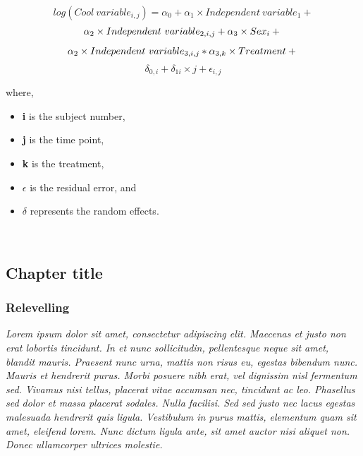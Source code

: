 \documentclass[
]{article}
\providecommand{\tightlist}{%
  \setlength{\itemsep}{0pt}\setlength{\parskip}{0pt}}
\begin{document}
\(~\)\\

\[
  log(Cool\ variable_{i,j}) = \alpha_0 + 
  \alpha_1\times Independent\ variable_1 +
\] \[
  \alpha_2\times Independent\ variable_{2,i,j} +
  \alpha_3\times Sex_i + \\
\] \[
  \alpha_2\times Independent\ variable_{3,i,j} *
  \alpha_{3,k} \times Treatment + \\ 
\] \[
  \delta_{0,i}+\delta_{1i}\times j+\epsilon_{i,j}
\]

where,

\begin{itemize}
\tightlist
\item
  \textbf{i} is the subject number,\\
\item
  \textbf{j} is the time point,\\
\item
  \textbf{k} is the treatment,\\
\item
  \(\epsilon\) is the residual error, and\\
\item
  \(\delta\) represents the random effects.
\end{itemize}

\(~\)\\

\hypertarget{chapter-title}{%
\subsection{Chapter title}\label{chapter-title}}

\hypertarget{relevelling}{%
\subsubsection{Relevelling}\label{relevelling}}

\emph{Lorem ipsum dolor sit amet, consectetur adipiscing elit. Maecenas
et justo non erat lobortis tincidunt. In et nunc sollicitudin,
pellentesque neque sit amet, blandit mauris. Praesent nunc urna, mattis
non risus eu, egestas bibendum nunc. Mauris et hendrerit purus. Morbi
posuere nibh erat, vel dignissim nisl fermentum sed. Vivamus nisi
tellus, placerat vitae accumsan nec, tincidunt ac leo. Phasellus sed
dolor et massa placerat sodales. Nulla facilisi. Sed sed justo nec lacus
egestas malesuada hendrerit quis ligula. Vestibulum in purus mattis,
elementum quam sit amet, eleifend lorem. Nunc dictum ligula ante, sit
amet auctor nisi aliquet non. Donec ullamcorper ultrices molestie.}
\end{document}
